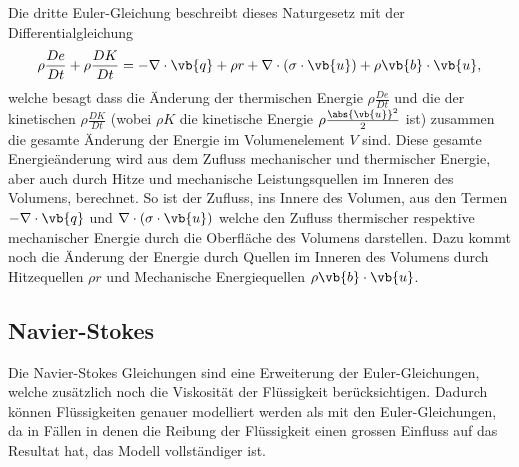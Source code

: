 Die dritte Euler-Gleichung beschreibt dieses Naturgesetz mit der Differentialgleichung 
\begin{equation}
\label{openfoam:euler3}
\rho \frac{De}{Dt}+  \rho \frac{DK}{Dt}
=
- \nabla \cdot \vb{q} + \rho r + \nabla \cdot (\sigma \cdot \vb{u}) + \rho \vb{b} \cdot \vb{u} 
,\end{equation}
welche besagt dass die Änderung der thermischen Energie $\rho \frac{De}{Dt}$ und die der kinetischen $\rho \frac{DK}{Dt}$ (wobei $\rho K$ die kinetische Energie $\rho \frac{\abs{\vb{u}}^{2}}{2}$ ist) zusammen die gesamte Änderung der Energie im Volumenelement $V$ sind.
Diese gesamte Energieänderung wird aus dem Zufluss mechanischer und thermischer Energie, aber auch durch Hitze und mechanische Leistungsquellen im Inneren des Volumens, berechnet.
So ist der Zufluss, ins Innere des Volumen, aus den Termen $- \nabla \cdot \vb{q}$ und $\nabla \cdot (\sigma \cdot \vb{u})$ welche den Zufluss thermischer respektive mechanischer Energie durch die Oberfläche des Volumens darstellen.
Dazu kommt noch die Änderung der Energie durch Quellen im Inneren des Volumens durch Hitzequellen $\rho r$ und Mechanische Energiequellen $\rho \vb{b} \cdot \vb{u}$.

\subsection{Navier-Stokes}
Die Navier-Stokes Gleichungen sind eine Erweiterung der Euler-Gleichungen, welche zusätzlich noch die Viskosität der Flüssigkeit berücksichtigen.
Dadurch können Flüssigkeiten genauer modelliert werden als mit den Euler-Gleichungen, da in Fällen in denen die Reibung der Flüssigkeit einen grossen Einfluss auf das Resultat hat, das Modell vollständiger ist.

